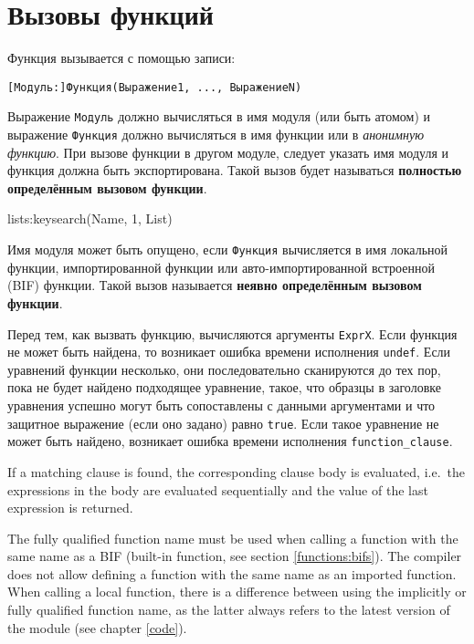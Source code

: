 \newpage
\section{Вызовы функций}
Функция вызывается с помощью записи:

\begin{verbatim}
[Модуль:]Функция(Выражение1, ..., ВыражениеN)
\end{verbatim}

Выражение \texttt{Модуль} должно вычисляться в имя модуля (или быть атомом) и
выражение \texttt{Функция} должно вычисляться в имя функции или в 
\textit{анонимную функцию}. При вызове функции в другом модуле, следует указать 
имя модуля и функция должна быть экспортирована. Такой вызов будет называться
\textbf{полностью определённым вызовом функции}.

\begin{erlang}
lists:keysearch(Name, 1, List)
\end{erlang}

Имя модуля может быть опущено, если \texttt{Функция} вычисляется в имя локальной 
функции, импортированной функции или авто-импортированной встроенной (BIF) 
функции. Такой вызов называется \textbf{неявно определённым вызовом функции}.

Перед тем, как вызвать функцию, вычисляются аргументы \texttt{ExprX}.  Если функция
не может быть найдена, то возникает ошибка времени исполнения \texttt{undef}.
Если уравнений функции несколько, они последовательно сканируются до тех пор, пока
не будет найдено подходящее уравнение, такое, что образцы в заголовке уравнения
успешно могут быть сопоставлены с данными аргументами и что защитное выражение 
(если оно задано) равно \texttt{true}.  Если такое уравнение не может быть найдено,
возникает ошибка времени исполнения \texttt{function\_clause}.

If a matching clause is found, the corresponding clause body is evaluated,
i.e.~the expressions in the body are evaluated sequentially and the
value of the last expression is returned.

The fully qualified function name must be used when calling a function
with the same name as a BIF (built-in function, see section
\ref{functions:bifs}). The compiler does not allow defining a function
with the same name as an imported function. When calling a local
function, there is a difference between using the implicitly or fully
qualified function name, as the latter always refers to the latest
version of the module (see chapter \ref{code}).


